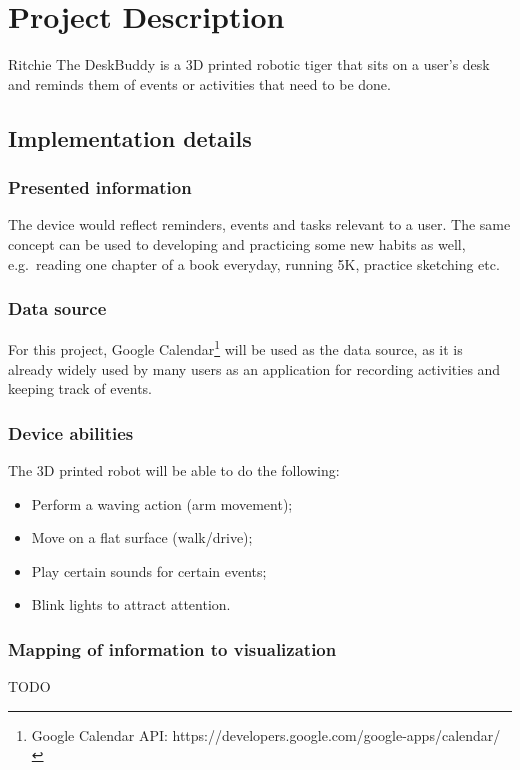 \documentclass{sigchi-ext}
\begin{document}
\section{Project Description}

Ritchie The DeskBuddy is a 3D printed robotic tiger that sits on a user's desk
and reminds them of events or activities that need to be done.

\subsection{Implementation details}

\subsubsection{Presented information}

The device would reflect reminders, events and tasks relevant to a user. The
same concept can be used to developing and practicing some new habits as well,
e.g.\ reading one chapter of a book everyday, running 5K, practice sketching
etc.

\subsubsection{Data source}

For this project, Google Calendar\footnote{Google Calendar API:
https://developers.google.com/google-apps/calendar/} will be used as the data
source, as it is already widely used by many users as an application for
recording activities and keeping track of events.

\subsubsection{Device abilities}

The 3D printed robot will be able to do the following:
\begin{itemize}
  \item Perform a waving action (arm movement);
  \item Move on a flat surface (walk/drive);
  \item Play certain sounds for certain events;
  \item Blink lights to attract attention.
\end{itemize}

\subsubsection{Mapping of information to visualization}
TODO
\end{document}
